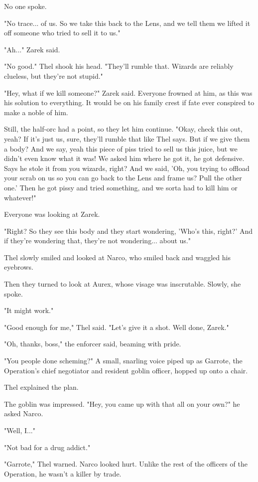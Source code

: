 \documentclass[10pt,a4paper,twoside,bg=print,twocolumn,openany,nodeprecatedcode]{dndbook}
\begin{document}
No one spoke.

"No trace... of us. So we take this back to the Lens, and we tell them we lifted it off someone who tried to sell it to us."

"Ah..." Zarek said.

"No good." Thel shook his head. "They'll rumble that. Wizards are reliably clueless, but they're not stupid."

"Hey, what if we kill someone?" Zarek said. Everyone frowned at him, as this was his solution to everything. It would be on his family crest if fate ever conspired to make a noble of him.

Still, the half-orc had a point, so they let him continue. "Okay, check this out, yeah? If it's just us, sure, they'll rumble that like Thel says. But if we give them a body? And we say, yeah this piece of piss tried to sell us this juice, but we didn't even know what it was! We asked him where he got it, he got defensive. Says he stole it from you wizards, right? And we said, 'Oh, you trying to offload your scrab on us so you can go back to the Lens and frame us? Pull the other one.' Then he got pissy and tried something, and we sorta had to kill him or whatever!"

Everyone was looking at Zarek.

"Right? So they see this body and they start wondering, 'Who's this, right?' And if they're wondering that, they're not wondering... about us."

Thel slowly smiled and looked at Narco, who smiled back and waggled his eyebrows.

Then they turned to look at Aurex, whose visage was inscrutable. Slowly, she spoke.

"It might work."

"Good enough for me," Thel said. "Let's give it a shot. Well done, Zarek."

"Oh, thanks, boss," the enforcer said, beaming with pride.

"You people done scheming?" A small, snarling voice piped up as Garrote, the Operation's chief negotiator and resident goblin officer, hopped up onto a chair.

Thel explained the plan.

The goblin was impressed. "Hey, you came up with that all on your own?" he asked Narco.

"Well, I..."

"Not bad for a drug addict."

"Garrote," Thel warned. Narco looked hurt. Unlike the rest of the officers of the Operation, he wasn't a killer by trade.
\end{document}
